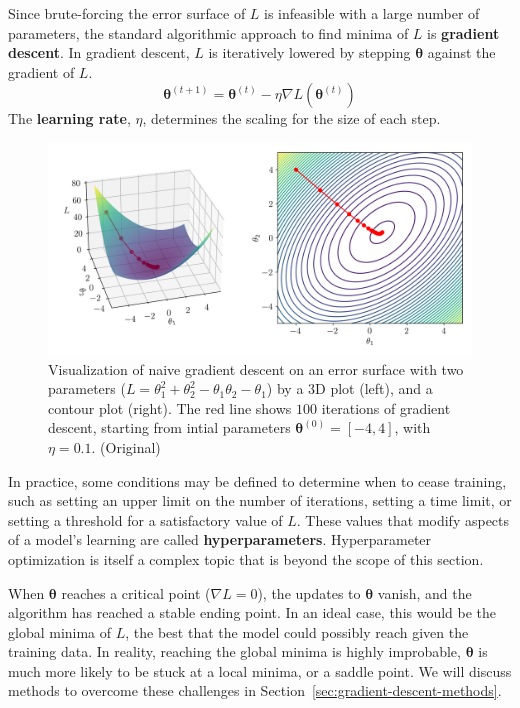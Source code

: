 \documentclass[12pt]{report}
\theoremstyle{definition}
\theoremstyle{remark}
\begin{document}
Since brute-forcing the error surface of $L$ is infeasible with a large number of parameters, the standard algorithmic approach to find minima of $L$ is \textbf{gradient descent}. In gradient descent, $L$ is iteratively lowered by stepping $\boldsymbol{\theta}$ against the gradient of $L$.
\begin{equation}
    \boldsymbol{\theta}^{(t+1)} = \boldsymbol{\theta}^{(t)}-\eta\nabla L(\boldsymbol{\theta}^{(t)})
\end{equation}
The \textbf{learning rate}, $\eta$, determines the scaling for the size of each step.

\begin{figure}[h]
    \centering
    \includegraphics[width=\linewidth]{figs/gradient_descent.png}
    \caption{Visualization of naive gradient descent on an error surface with two parameters ($L = \theta_1^2 + \theta_2^2 - \theta_1\theta_2 - \theta_1$) by a 3D plot (left), and a contour plot (right). The red line shows $100$ iterations of gradient descent, starting from intial parameters $\boldsymbol{\theta}^{(0)} = [-4,4]$, with $\eta = 0.1$. (Original)}
    \label{fig:enter-label}
\end{figure}

In practice, some conditions may be defined to determine when to cease training, such as setting an upper limit on the number of iterations, setting a time limit, or setting a threshold for a satisfactory value of $L$. These values that modify aspects of a model's learning are called \textbf{\glspl{hyperparameter}}. Hyperparameter optimization is itself a complex topic that is beyond the scope of this section.

When $\boldsymbol{\theta}$ reaches a critical point ($\nabla L = 0$), the updates to $\boldsymbol{\theta}$ vanish, and the algorithm has reached a stable ending point. In an ideal case, this would be the global minima of $L$, the best that the model could possibly reach given the training data. In reality, reaching the global minima is highly improbable, $\boldsymbol{\theta}$ is much more likely to be stuck at a local minima, or a saddle point. We will discuss methods to overcome these challenges in Section~\ref{sec:gradient-descent-methods}.
\end{document}
